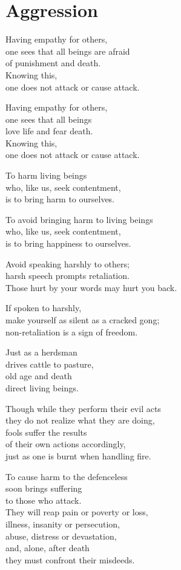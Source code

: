 
\chapter{Aggression}


Having empathy for others,\\
one sees that all beings are afraid\\
of punishment and death.\\
Knowing this,\\
one does not attack or cause attack.


Having empathy for others,\\
one sees that all beings\\
love life and fear death.\\
Knowing this,\\
one does not attack or cause attack.


To harm living beings\\
who, like us, seek contentment,\\
is to bring harm to ourselves.


To avoid bringing harm to living beings\\
who, like us, seek contentment,\\
is to bring happiness to ourselves.


Avoid speaking harshly to others;\\
harsh speech prompts retaliation.\\
Those hurt by your words may hurt you back.


If spoken to harshly,\\
make yourself as silent as a cracked gong;\\
non-retaliation is a sign of freedom.


Just as a herdsman\\
drives cattle to pasture,\\
old age and death\\
direct living beings.


Though while they perform their evil acts\\
they do not realize what they are doing,\\
fools suffer the results\\
of their own actions accordingly,\\
just as one is burnt when handling fire.


To cause harm to the defenceless\\
soon brings suffering\\
to those who attack.\\
They will reap pain or poverty or loss,\\
illness, insanity or persecution,\\
abuse, distress or devastation,\\
and, alone, after death\\
they must confront their misdeeds.


